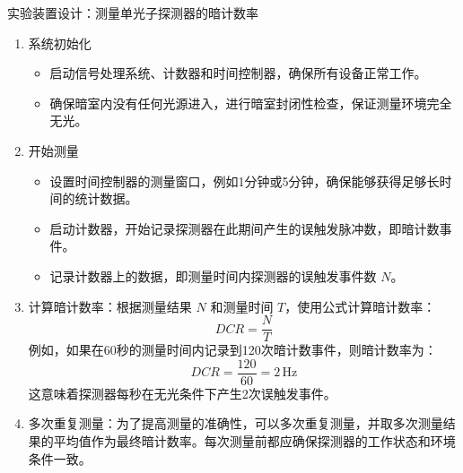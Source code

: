 \begin{ubox}{实验装置设计：测量单光子探测器的暗计数率}
\begin{enumerate}
		\item 系统初始化  
		\begin{itemize}
			\item 启动信号处理系统、计数器和时间控制器，确保所有设备正常工作。
			\item 确保暗室内没有任何光源进入，进行暗室封闭性检查，保证测量环境完全无光。
		\end{itemize}
		
		\item 开始测量  
		\begin{itemize}
			\item 设置时间控制器的测量窗口，例如1分钟或5分钟，确保能够获得足够长时间的统计数据。
			\item 启动计数器，开始记录探测器在此期间产生的误触发脉冲数，即暗计数事件。
			\item 记录计数器上的数据，即测量时间内探测器的误触发事件数 \(N\)。
		\end{itemize}
		
		\item 计算暗计数率：根据测量结果 \(N\) 和测量时间 \(T\)，使用公式计算暗计数率：
		\[
		DCR = \frac{N}{T}
		\]
		例如，如果在60秒的测量时间内记录到120次暗计数事件，则暗计数率为：
		\[
		DCR = \frac{120}{60} = 2 \, \text{Hz}
		\]
		这意味着探测器每秒在无光条件下产生2次误触发事件。  
		
		\item 多次重复测量：为了提高测量的准确性，可以多次重复测量，并取多次测量结果的平均值作为最终暗计数率。每次测量前都应确保探测器的工作状态和环境条件一致。  
	\end{enumerate}
\end{ubox}

